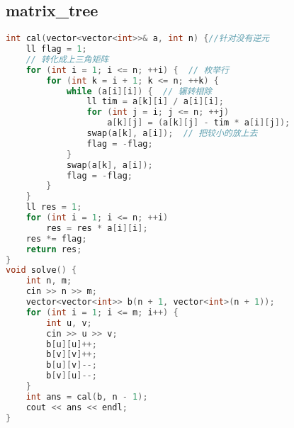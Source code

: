 \subsection{matrix\_tree}
\begin{lstlisting}[language=C++]
int cal(vector<vector<int>>& a, int n) {//针对没有逆元
    ll flag = 1;
    // 转化成上三角矩阵
    for (int i = 1; i <= n; ++i) {  // 枚举行
        for (int k = i + 1; k <= n; ++k) {
            while (a[i][i]) {  // 辗转相除
                ll tim = a[k][i] / a[i][i];
                for (int j = i; j <= n; ++j)
                    a[k][j] = (a[k][j] - tim * a[i][j]);
                swap(a[k], a[i]);  // 把较小的放上去
                flag = -flag;
            }
            swap(a[k], a[i]);
            flag = -flag;
        }
    }
    ll res = 1;
    for (int i = 1; i <= n; ++i)
        res = res * a[i][i];
    res *= flag;
    return res;
}
void solve() {
    int n, m;
    cin >> n >> m;
    vector<vector<int>> b(n + 1, vector<int>(n + 1));
    for (int i = 1; i <= m; i++) {
        int u, v;
        cin >> u >> v;
        b[u][u]++;
        b[v][v]++;
        b[u][v]--;
        b[v][u]--;
    }
    int ans = cal(b, n - 1);
    cout << ans << endl;
}
\end{lstlisting}
